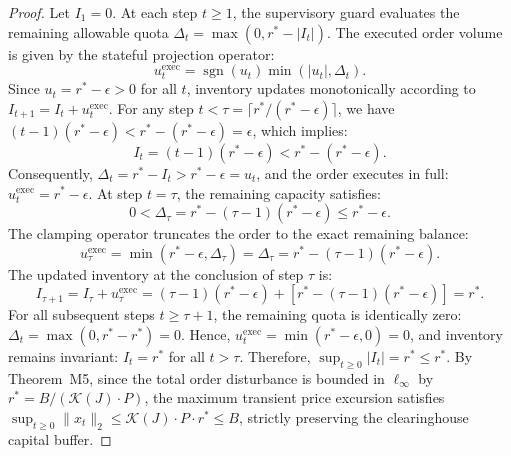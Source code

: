 \documentclass[11pt,a4paper]{article}
\theoremstyle{definition}\newtheorem{definition}[theorem]{Definition}
\theoremstyle{remark}\newtheorem{remark}[theorem]{Remark}
\begin{document}
\begin{proof}
Let $I_1 = 0$. At each step $t \ge 1$, the supervisory guard evaluates the remaining allowable quota $\Delta_t = \max(0, r^* - |I_t|)$. The executed order volume is given by the stateful projection operator:
\begin{equation}
u_t^{\text{exec}} = \operatorname{sgn}(u_t) \min\left(|u_t|, \Delta_t\right).
\end{equation}
Since $u_t = r^* - \epsilon > 0$ for all $t$, inventory updates monotonically according to $I_{t+1} = I_t + u_t^{\text{exec}}$.
For any step $t < \tau = \lceil r^* / (r^* - \epsilon) \rceil$, we have $(t-1)(r^* - \epsilon) < r^* - (r^* - \epsilon) = \epsilon$, which implies:
\begin{equation}
I_t = (t - 1)(r^* - \epsilon) < r^* - (r^* - \epsilon).
\end{equation}
Consequently, $\Delta_t = r^* - I_t > r^* - \epsilon = u_t$, and the order executes in full: $u_t^{\text{exec}} = r^* - \epsilon$.
At step $t = \tau$, the remaining capacity satisfies:
\begin{equation}
0 < \Delta_\tau = r^* - (\tau - 1)(r^* - \epsilon) \le r^* - \epsilon.
\end{equation}
The clamping operator truncates the order to the exact remaining balance:
\begin{equation}
u_\tau^{\text{exec}} = \min(r^* - \epsilon, \Delta_\tau) = \Delta_\tau = r^* - (\tau - 1)(r^* - \epsilon).
\end{equation}
The updated inventory at the conclusion of step $\tau$ is:
\begin{equation}
I_{\tau+1} = I_\tau + u_\tau^{\text{exec}} = (\tau - 1)(r^* - \epsilon) + [r^* - (\tau - 1)(r^* - \epsilon)] = r^*.
\end{equation}
For all subsequent steps $t \ge \tau + 1$, the remaining quota is identically zero: $\Delta_t = \max(0, r^* - r^*) = 0$. Hence, $u_t^{\text{exec}} = \min(r^* - \epsilon, 0) = 0$, and inventory remains invariant: $I_t = r^*$ for all $t > \tau$.
Therefore, $\sup_{t \ge 0} |I_t| = r^* \le r^*$. By Theorem~M5, since the total order disturbance is bounded in $\ell_\infty$ by $r^* = B / (\mathcal{K}(J) \cdot P)$, the maximum transient price excursion satisfies $\sup_{t \ge 0} \|x_t\|_2 \le \mathcal{K}(J) \cdot P \cdot r^* \le B$, strictly preserving the clearinghouse capital buffer.
\end{proof}
\end{document}
